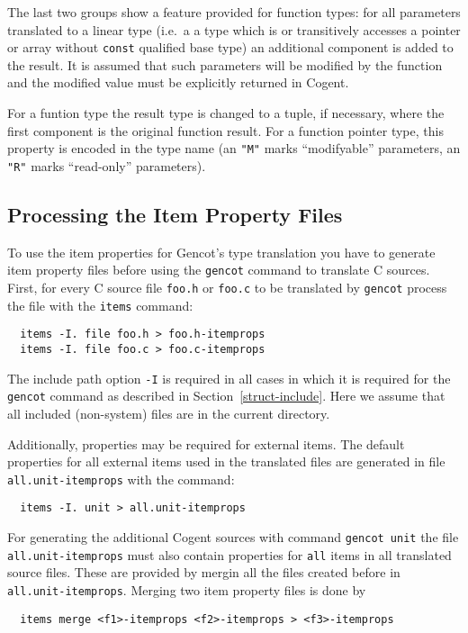 \documentclass[a4paper]{report}
\newcommand{\code}[1]{\textnormal{\texttt{#1}}}
\begin{document}
The last two groups show a feature provided for function types: for all parameters translated to a linear type (i.e.~a
a type which is or transitively accesses a pointer or array without \code{const} qualified base type) an additional
component is added to the result. It is assumed that such parameters will be modified by the function and the modified
value must be explicitly returned in Cogent.

For a funtion type the result type is changed to a tuple, if necessary, where the first component is the original 
function result. For a function pointer type, this property is encoded in the type name (an \code{"M"} marks 
``modifyable'' parameters, an \code{"R"} marks ``read-only'' parameters).

\subsection{Processing the Item Property Files}
\label{types-dfltprops-process}

To use the item properties for Gencot's type translation you have to generate item property files before using the 
\code{gencot} command to translate C sources. First, for every C source file \code{foo.h} or \code{foo.c} 
to be translated by \code{gencot} process the file with the \code{items} command:
\begin{verbatim}
  items -I. file foo.h > foo.h-itemprops
  items -I. file foo.c > foo.c-itemprops
\end{verbatim}
The include path option \code{-I} is required in all cases in which it is required for the \code{gencot} command as 
described in Section~\ref{struct-include}. Here we assume that all included (non-system) files are in the current 
directory.

Additionally, properties may be required for external items. The default properties for all external items used in the 
translated files are generated in file \code{all.unit-itemprops} with the command:
\begin{verbatim}
  items -I. unit > all.unit-itemprops
\end{verbatim}

For generating the additional Cogent sources with command \code{gencot unit} the file \code{all.unit-itemprops} must
also contain properties for \code{all} items in all translated source files. These are provided by mergin all the files created 
before in \code{all.unit-itemprops}. Merging two item property files is done by 
\begin{verbatim}
  items merge <f1>-itemprops <f2>-itemprops > <f3>-itemprops
\end{verbatim}
\end{document}
